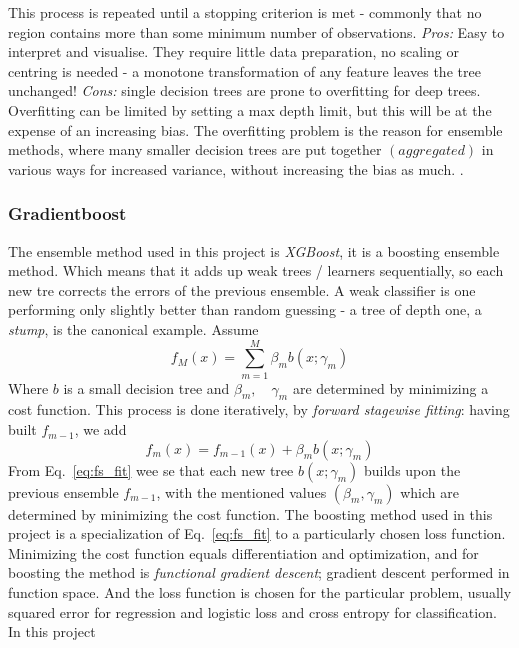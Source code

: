 This process is repeated until 
a stopping criterion is met - commonly that no region
contains more than some minimum number of observations.
\textit{Pros:} Easy to interpret and visualise. They require
little data preparation, no scaling or centring is needed - 
a monotone transformation of any feature leaves the tree unchanged!
\textit{Cons:} single decision trees are prone to overfitting for deep trees.
Overfitting can be limited by setting a max depth limit, 
but this will be at the expense of an increasing bias. 
The overfitting problem is the reason for ensemble methods,
where many smaller decision trees are put together $(aggregated)$
in various ways for increased variance, without increasing the bias as much.
\cite[p.~199-208]{LectureNotes}.  
\subsubsection{Gradientboost}
The ensemble method used in this project is \textit{XGBoost}, it is a boosting ensemble method.
Which means that it adds up weak trees / learners sequentially, so each new tre corrects the 
errors of the previous ensemble. A weak classifier is one performing
only slightly better than random guessing - a tree of depth one, a \textit{stump}, is the canonical example.
Assume 
\begin{equation}
    f_M(x) = \sum_{m=1}^{M}\beta_mb(x;\gamma_m)
    \label{eq: tree_basis}
\end{equation}
Where $b$ is a small decision tree and $\beta_m, \quad \gamma_m$ are determined
by minimizing a cost function. 
This process is done iteratively, by 
\textit{forward stagewise fitting}: having built $f_{m-1}$, we add
\begin{equation}
    f_m(x) = f_{m-1}(x) + \beta_m b(x;\gamma_m)
    \label{eq:fs_fit}
\end{equation}
From Eq.~\eqref{eq:fs_fit} wee se that each new tree $b(x;\gamma_m)$ builds upon
the previous ensemble $f_{m-1}$, with the mentioned values $(\beta_m, \gamma_m)$ which
are determined by minimizing the cost function. The boosting method used in this 
project is a specialization of Eq.~\eqref{eq:fs_fit} to a particularly chosen
loss function.  
Minimizing the cost function
equals differentiation and optimization, and for boosting the method is
\textit{functional gradient descent}; gradient descent performed in function space.
And the loss function is chosen for the particular problem, usually squared error for
regression and logistic loss and cross entropy for classification. In this project
